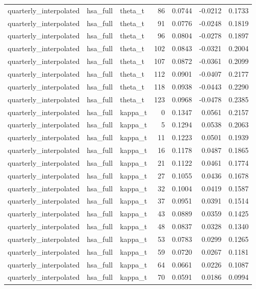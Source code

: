 \begin{tabular}{lllrrrr}
quarterly\_interpolated & hsa\_full & theta\_t & 86 & 0.0744 & -0.0212 & 0.1733 \\
quarterly\_interpolated & hsa\_full & theta\_t & 91 & 0.0776 & -0.0248 & 0.1819 \\
quarterly\_interpolated & hsa\_full & theta\_t & 96 & 0.0804 & -0.0278 & 0.1897 \\
quarterly\_interpolated & hsa\_full & theta\_t & 102 & 0.0843 & -0.0321 & 0.2004 \\
quarterly\_interpolated & hsa\_full & theta\_t & 107 & 0.0872 & -0.0361 & 0.2099 \\
quarterly\_interpolated & hsa\_full & theta\_t & 112 & 0.0901 & -0.0407 & 0.2177 \\
quarterly\_interpolated & hsa\_full & theta\_t & 118 & 0.0938 & -0.0443 & 0.2290 \\
quarterly\_interpolated & hsa\_full & theta\_t & 123 & 0.0968 & -0.0478 & 0.2385 \\
quarterly\_interpolated & hsa\_full & kappa\_t & 0 & 0.1347 & 0.0561 & 0.2157 \\
quarterly\_interpolated & hsa\_full & kappa\_t & 5 & 0.1294 & 0.0538 & 0.2063 \\
quarterly\_interpolated & hsa\_full & kappa\_t & 11 & 0.1223 & 0.0501 & 0.1939 \\
quarterly\_interpolated & hsa\_full & kappa\_t & 16 & 0.1178 & 0.0487 & 0.1865 \\
quarterly\_interpolated & hsa\_full & kappa\_t & 21 & 0.1122 & 0.0461 & 0.1774 \\
quarterly\_interpolated & hsa\_full & kappa\_t & 27 & 0.1055 & 0.0436 & 0.1678 \\
quarterly\_interpolated & hsa\_full & kappa\_t & 32 & 0.1004 & 0.0419 & 0.1587 \\
quarterly\_interpolated & hsa\_full & kappa\_t & 37 & 0.0951 & 0.0391 & 0.1514 \\
quarterly\_interpolated & hsa\_full & kappa\_t & 43 & 0.0889 & 0.0359 & 0.1425 \\
quarterly\_interpolated & hsa\_full & kappa\_t & 48 & 0.0837 & 0.0328 & 0.1340 \\
quarterly\_interpolated & hsa\_full & kappa\_t & 53 & 0.0783 & 0.0299 & 0.1265 \\
quarterly\_interpolated & hsa\_full & kappa\_t & 59 & 0.0720 & 0.0267 & 0.1181 \\
quarterly\_interpolated & hsa\_full & kappa\_t & 64 & 0.0661 & 0.0226 & 0.1087 \\
quarterly\_interpolated & hsa\_full & kappa\_t & 70 & 0.0591 & 0.0186 & 0.0994 \\

\end{tabular}
